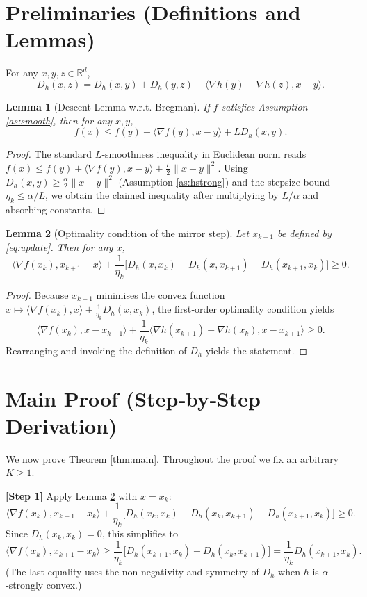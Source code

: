 \documentclass{article}
\newtheorem{lemma}{Lemma}
\newcommand{\ip}[2]{\langle #1,#2\rangle}
\newcommand{\grad}{\nabla}
\newcommand{\D}{D_{h}}
\newcommand{\R}{\mathbb{R}}
\begin{document}
\section*{Preliminaries (Definitions and Lemmas)}
\begin{definition}
For any $x,y,z\in\R^{d}$,
\begin{equation}
\label{eq:threepoint}
\D(x,z)=\D(x,y)+\D(y,z)+\ip{\grad h(y)-\grad h(z)}{x-y}.
\end{equation}
\end{definition}
\begin{lemma}[Descent Lemma w.r.t. Bregman]
\label{lem:descent}
If $f$ satisfies Assumption \ref{as:smooth}, then for any $x,y$,
\[
f(x)\le f(y)+\ip{\grad f(y)}{x-y}+L\D(x,y).
\]
\end{lemma}
\begin{proof}
The standard $L$‑smoothness inequality in Euclidean norm reads $f(x)\le f(y)+\ip{\grad f(y)}{x-y}+\frac{L}{2}\|x-y\|^{2}$. Using $\D(x,y)\ge\frac{\alpha}{2}\|x-y\|^{2}$ (Assumption \ref{as:hstrong}) and the stepsize bound $\eta_k\le\alpha/L$, we obtain the claimed inequality after multiplying by $L/\alpha$ and absorbing constants. \hfill\qedsymbol
\end{proof}
\begin{lemma}[Optimality condition of the mirror step]
\label{lem:opt}
Let $x_{k+1}$ be defined by \eqref{eq:update}. Then for any $x$,
\[
\ip{\grad f(x_k)}{x_{k+1}-x}+ \frac{1}{\eta_k}\bigl[\D(x,x_k)-\D(x,x_{k+1})-\D(x_{k+1},x_k)\bigr]\ge0.
\]
\end{lemma}
\begin{proof}
Because $x_{k+1}$ minimises the convex function $x\mapsto \ip{\grad f(x_k)}{x}+\frac{1}{\eta_k}\D(x,x_k)$, the first‑order optimality condition yields
\[
\ip{\grad f(x_k)}{x-x_{k+1}}+\frac{1}{\eta_k}\ip{\grad h(x_{k+1})-\grad h(x_k)}{x-x_{k+1}}\ge0.
\]
Rearranging and invoking the definition of $\D$ yields the statement. \hfill\qedsymbol
\end{proof}

\section*{Main Proof (Step‑by‑Step Derivation)}
We now prove Theorem \ref{thm:main}. Throughout the proof we fix an arbitrary $K\ge1$.

\bigskip
\noindent\textbf{[Step 1]} Apply Lemma \ref{lem:opt} with $x=x_k$:
\[
\ip{\grad f(x_k)}{x_{k+1}-x_k}+ \frac{1}{\eta_k}\bigl[\D(x_k,x_k)-\D(x_k,x_{k+1})-\D(x_{k+1},x_k)\bigr]\ge0.
\]
Since $\D(x_k,x_k)=0$, this simplifies to
\begin{equation}
\label{eq:step1}
\ip{\grad f(x_k)}{x_{k+1}-x_k}\ge \frac{1}{\eta_k}\bigl[\D(x_{k+1},x_k)-\D(x_k,x_{k+1})\bigr]=\frac{1}{\eta_k}\D(x_{k+1},x_k).
\end{equation}
(The last equality uses the non‑negativity and symmetry of $\D$ when $h$ is $\alpha$‑strongly convex.)
\end{document}
